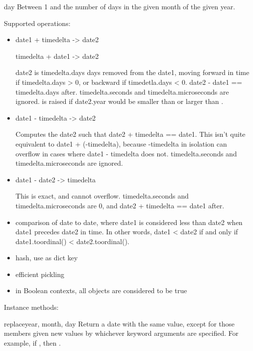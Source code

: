 \begin{memberdesc}{day}
  Between 1 and the number of days in the given month of the given
  year.
\end{memberdesc}

Supported operations:

\begin{itemize}
  \item
    date1 + timedelta -> date2

    timedelta + date1 -> date2

    date2 is timedelta.days days removed from the date1, moving forward
    in time if timedelta.days > 0, or backward if timedetla.days < 0.
    date2 - date1 == timedelta.days after.  timedelta.seconds and
    timedelta.microseconds are ignored.   is
    raised if date2.year would be smaller than  or
    larger than .

  \item
    date1 - timedelta -> date2

    Computes the date2 such that date2 + timedelta == date1.  This
    isn't quite equivalent to date1 + (-timedelta), because -timedelta
    in isolation can overflow in cases where date1 - timedelta does
    not.  timedelta.seconds and timedelta.microseconds are ignored.

  \item
    date1 - date2 -> timedelta

    This is exact, and cannot overflow.  timedelta.seconds and
    timedelta.microseconds are 0, and date2 + timedelta == date1
    after.

  \item
    comparison of date to date, where date1 is considered less than
    date2 when date1 precedes date2 in time.  In other words,
    date1 < date2 if and only if date1.toordinal() < date2.toordinal().

  \item
    hash, use as dict key

  \item
    efficient pickling

  \item
    in Boolean contexts, all  objects are considered to be true
\end{itemize}

Instance methods:

\begin{methoddesc}{replace}{year, month, day}
  Return a date with the same value, except for those members given
  new values by whichever keyword arguments are specified.  For
  example, if , then
  .
\end{methoddesc}

